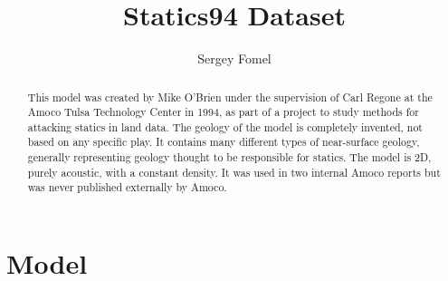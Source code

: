 \author{Sergey Fomel}
\title{Statics94 Dataset}

\maketitle

\begin{abstract}
  This model was created by Mike O'Brien under the supervision of Carl
  Regone at the Amoco Tulsa Technology Center in 1994, as part of a
  project to study methods for attacking statics in land data. The
  geology of the model is completely invented, not based on any
  specific play. It contains many different types of near-surface
  geology, generally representing geology thought to be responsible
  for statics. The model is 2D, purely acoustic, with a constant
  density. It was used in two internal Amoco reports but was never
  published externally by Amoco.
\end{abstract}


\section{Model}

 \clearpage
{} \clearpage
{} \clearpage

